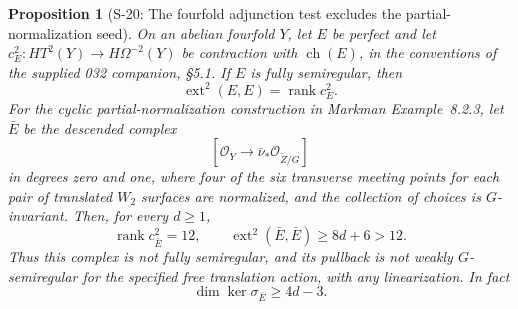 \documentclass[11pt,a4paper]{article}
\newtheorem{proposition}[theorem]{Proposition}
\theoremstyle{definition}
\begin{document}
\begin{proposition}[S-20: The fourfold adjunction test excludes the partial-normalization seed]
\label{prop:semireg-fourfold-partial-normalization}
On an abelian fourfold $Y$, let $E$ be perfect and let
$c_E^2:HT^2(Y)\to H\Omega^{-2}(Y)$ be contraction with
$\operatorname{ch}(E)$, in the conventions of the supplied
032 companion, \S5.1. If $E$ is fully semiregular, then
\[
 \operatorname{ext}^2(E,E)=\operatorname{rank}c_E^2.
 \tag{S20.1}
\]
For the cyclic partial-normalization construction in Markman
Example~8.2.3, let $\bar E$ be the descended complex
\[
 [\mathcal O_Y\longrightarrow
       \bar\nu_*\mathcal O_{\widetilde Z/G}]
\]
in degrees zero and one, where four of the six transverse
meeting points for each pair of translated $W_2$ surfaces
are normalized, and the collection of choices is $G$-invariant.
Then, for every $d\ge1$,
\[
 \operatorname{rank}c_{\bar E}^2=12,
 \qquad
 \operatorname{ext}^2(\bar E,\bar E)\ge8d+6>12.
 \tag{S20.2}
\]
Thus this complex is not fully semiregular, and its pullback
is not weakly $G$-semiregular for the specified free translation
action, with any linearization. In fact
\[
 \dim\ker\sigma_{\bar E}\ge4d-3.
 \tag{S20.3}
\]
\end{proposition}
\end{document}
